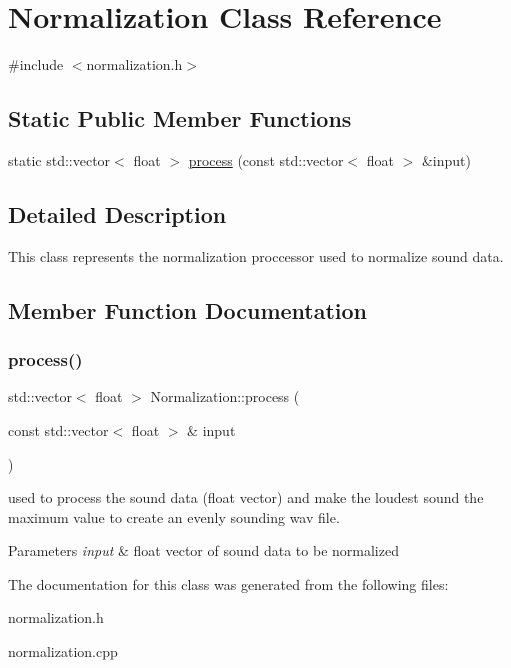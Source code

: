 \hypertarget{classNormalization}{}\section{Normalization Class Reference}
\label{classNormalization}


{\ttfamily \#include $<$normalization.\+h$>$}

\subsection*{Static Public Member Functions}
\begin{DoxyCompactItemize}
\item 
static std\+::vector$<$ float $>$ \hyperlink{classNormalization_a7f69c9adcc4f23a4d608c98840675956}{process} (const std\+::vector$<$ float $>$ \&input)
\end{DoxyCompactItemize}


\subsection{Detailed Description}
This class represents the normalization proccessor used to normalize sound data. 

\subsection{Member Function Documentation}
\mbox{\label{classNormalization_a7f69c9adcc4f23a4d608c98840675956}} 
\subsubsection{\texorpdfstring{process()}{process()}}
{\footnotesize\ttfamily std\+::vector$<$ float $>$ Normalization\+::process (\begin{DoxyParamCaption}\item[{const std\+::vector$<$ float $>$ \&}]{input }\end{DoxyParamCaption})\hspace{0.3cm}{\ttfamily [static]}}

used to process the sound data (float vector) and make the loudest sound the maximum value to create an evenly sounding wav file. 
\begin{DoxyParams}{Parameters}
{\em input} & float vector of sound data to be normalized \\
\hline
\end{DoxyParams}


The documentation for this class was generated from the following files\+:\begin{DoxyCompactItemize}
\item 
normalization.\+h\item 
normalization.\+cpp\end{DoxyCompactItemize}
